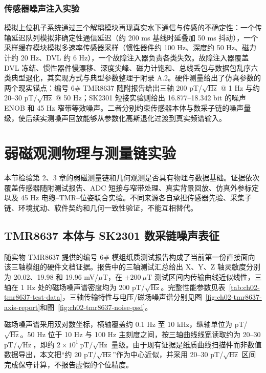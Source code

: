 \subsubsection{传感器噪声注入实验}\label{sec:ch05-5-2-3}

模拟上位机子系统通过三个解耦模块再现真实水下通信与传感的不确定性：一个传输延迟队列模拟非确定性通信延迟（约 200 ms 基线时延叠加 50 ms 抖动），一个采样缓存模块模拟多速率传感器采样（惯性器件约 100 Hz、深度约 50 Hz、磁力计约 20 Hz、DVL 约 6 Hz），一个故障注入器负责各类失效。故障注入器覆盖 DVL 冻结、惯性器件慢漂移、深度尖峰、磁力计饱和、总线丢包与数据包乱序六类典型退化，其实现方式与典型参数整理于附录 A.2。硬件测量给出了仿真参数的两个现实锚点：编号 6\# TMR8637 随附报告给出三轴 200 pT/\(\sqrt{\text{Hz}}\) @ 1 Hz 与约 20--30 pT/\(\sqrt{\text{Hz}}\) @ 50 Hz；SK2301 短接实验则给出 16.877--18.342 bit 的噪声 ENOB 和 45 Hz 窄带等效噪声。二者分别约束传感器本体与数采子链的噪声量级，使后续实测噪声回放能够从参数化高斯退化过渡到真实频谱输入。

\section{弱磁观测物理与测量链实验}\label{sec:ch05-magnetic-chain}

本节检验第 2、3 章的弱磁测量链和几何观测是否具有物理与数据基础。证据依次覆盖传感器随附测试报告、ADC 短接与窄带处理、真实背景回放、仿真外参标定以及 45 Hz 电缆--TMR--位姿联合实验。不同来源各自承担传感器先验、采集子链、环境扰动、软件契约和几何一致性验证，不能互相替代。

\subsection{TMR8637 本体与 SK2301 数采链噪声表征}\label{sec:ch05-5-3-2}

随实物 TMR8637 提供的编号 6\# 模组纸质测试报告构成了当前第一份直接面向该三轴模组的硬件文档证据。报告中的三轴测试汇总给出 X、Y、Z 轴灵敏度分别为 20.02、19.98 和 19.96 mV/\(\mu\)T，在 \(\pm200\ \mu\text{T}\) 测试区间内传输曲线近似线性，三轴在 1 Hz 处的磁场噪声谱密度均为 200 pT/\(\sqrt{\text{Hz}}\)。完整性能参数见表~\ref{tab:ch02-tmr8637-test-data}，三轴传输特性与电压/磁场噪声谱分别见图~\ref{fig:ch02-tmr8637-axis-report}和图~\ref{fig:ch02-tmr8637-noise-psd}。

磁场噪声谱采用双对数坐标，横轴覆盖约 0.1 Hz 至 10 kHz，纵轴单位为 pT/\(\sqrt{\text{Hz}}\)。50 Hz 位于 10 Hz 与 100 Hz 主刻度之间，按三轴曲线线宽读取约为 20--30 pT/\(\sqrt{\text{Hz}}\)，即约 \(2\times10^1\ \text{pT}/\sqrt{\text{Hz}}\) 量级。由于现有证据是纸质曲线扫描件而非数值数据导出，本文把``约 20 pT/\(\sqrt{\text{Hz}}\)''作为中心近似，并采用 20--30 pT/\(\sqrt{\text{Hz}}\) 区间完成保守计算，不报告虚假的个位精度。

